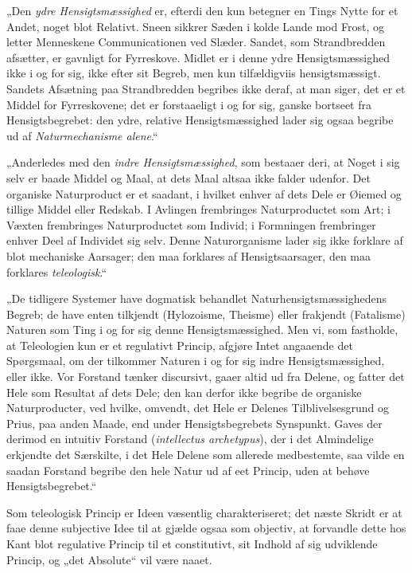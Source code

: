 \documentclass[12pt]{book}
\newcommand{\opage}[1]{\marginnote{\footnotesize\textit{[#1]}}}
\begin{document}
„Den \emph{ydre Hensigtsmæssighed} er, efterdi den kun betegner en Tings Nytte for et Andet,
noget blot Relativt. Sneen sikkrer Sæden i kolde Lande mod Frost, og letter Menneskene
Communicationen ved Slæder. Sandet, som Strandbredden afsætter, er gavnligt for Fyrreskove.
Midlet er i denne ydre Hensigtsmæssighed ikke i og for sig, ikke
\opage{121} efter sit Begreb, men kun tilfældigviis hensigtsmæssigt. Sandets Afsætning paa Strandbredden
begribes ikke deraf, at man siger, det er et Middel for Fyrreskovene; det er forstaaeligt i og
for sig, ganske bortseet fra Hensigtsbegrebet: den ydre, relative Hensigtsmæssighed lader sig
ogsaa begribe ud af \emph{Naturmechanisme alene}.“

„Anderledes med den \emph{indre Hensigtsmæssighed}, som bestaaer deri, at Noget i sig selv er
baade Middel og Maal, at dets Maal altsaa ikke falder udenfor. Det organiske Naturproduct er et
saadant, i hvilket enhver af dets Dele er Øiemed og tillige Middel eller Redskab. I Avlingen
frembringes Naturproductet som Art; i Væxten frembringes Naturproductet som Individ; i
Formningen frembringer enhver Deel af Individet sig selv. Denne Naturorganisme lader sig ikke
forklare af blot mechaniske Aarsager; den maa forklares af Hensigtsaarsager, den maa forklares
\emph{teleologisk}.“

„De tidligere Systemer have dogmatisk behandlet Naturhensigtsmæssighedens Begreb; de have enten
tilkjendt (Hylozoisme, Theisme) eller frakjendt (Fatalisme) Naturen som Ting i og for sig denne
Hensigtsmæssighed. Men vi, som fastholde, at Teleologien kun er et regulativt Princip, afgjøre
Intet angaaende det Spørgsmaal, om der tilkommer Naturen i og for sig indre Hensigtsmæssighed,
eller ikke. Vor Forstand tænker discursivt, gaaer altid ud fra Delene, og fatter det Hele som
Resultat af dets Dele; den kan derfor ikke begribe de organiske Naturproducter, ved hvilke,
omvendt, det Hele er Delenes Tilblivelsesgrund og Prius, paa anden Maade, end under
Hensigtsbegrebets Synspunkt. Gaves der derimod en intuitiv Forstand (\textit{intellectus
archetypus}), der i det Almindelige erkjendte det Særskilte, i det Hele Delene som allerede
medbestemte, saa vilde en saadan Forstand begribe den hele Natur ud af eet Princip, uden at
behøve Hensigtsbegrebet.“

\opage{122} Som teleologisk Princip er Ideen væsentlig charakteriseret; det næste Skridt er at faae denne
subjective Idee til at gjælde ogsaa som objectiv, at forvandle dette hos Kant blot regulative
Princip til et constitutivt, sit Indhold af sig udviklende Princip, og „det Absolute“ vil være
naaet.
\end{document}
